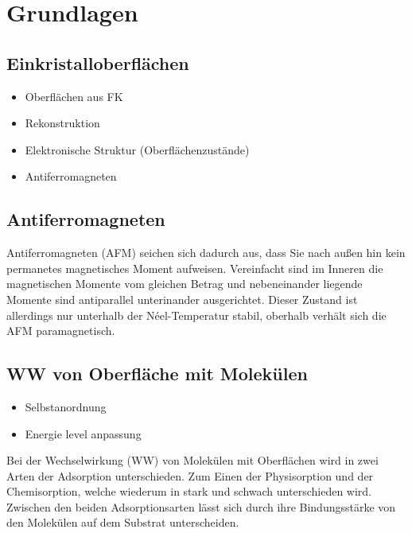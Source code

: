 \chapter{Grundlagen}
    \section{Einkristalloberflächen}
        \begin{itemize}
            \item Oberflächen aus FK
            \item Rekonstruktion
            \item Elektronische Struktur (Oberflächenzustände)
            \item Antiferromagneten
        \end{itemize}

    \section{Antiferromagneten}
        Antiferromagneten (AFM) seichen sich dadurch aus, dass Sie nach außen hin kein permanetes magnetisches Moment aufweisen.
        Vereinfacht sind im Inneren die magnetischen Momente vom gleichen Betrag und nebeneinander liegende Momente sind antiparallel unterinander ausgerichtet.
        Dieser Zustand ist allerdings nur unterhalb der Néel-Temperatur stabil, oberhalb verhält sich die AFM paramagnetisch.
    
    \section{WW von Oberfläche mit Molekülen}
        \cite{ma-DJ}
        \begin{itemize}
            \item Selbstanordnung
            \item Energie level anpassung
        \end{itemize}
        Bei der Wechselwirkung (WW) von Molekülen mit Oberflächen wird in zwei Arten der Adsorption unterschieden. 
        Zum Einen der Physisorption und der Chemisorption, welche wiederum in stark und schwach unterschieden wird.
        Zwischen den beiden Adsorptionsarten lässt sich durch ihre Bindungsstärke von den Molekülen auf dem Substrat unterscheiden.
